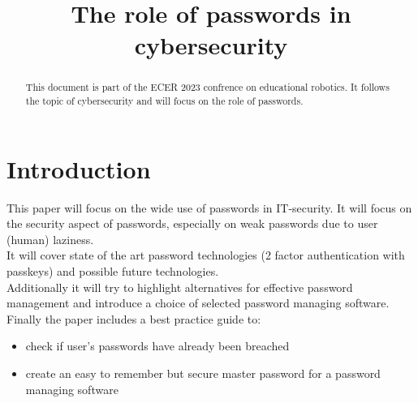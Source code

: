\documentclass[conference]{IEEEtran}
\begin{document}
\title{The role of passwords in cybersecurity}
\author{
\and
{}
\and
{}
\and
{}
}
\maketitle

\begin{abstract}
This document is part of the ECER 2023 confrence on educational robotics. It follows the topic of cybersecurity and will focus on the role of passwords.
\end{abstract}
\vspace{1cm}

\section{Introduction}
This paper will focus on the wide use of passwords in IT-security. It will focus on the security aspect of passwords, especially on weak passwords due to user (human) laziness. \\
It will cover state of the art password technologies (2 factor authentication with passkeys) and possible future technologies.\\
Additionally it will try to highlight alternatives for effective password management and introduce a choice of selected password managing software. \\
Finally the paper includes a best practice guide to:
\begin{itemize}
\item check if user's passwords have already been breached 
\item create an easy to remember but secure master password for a password managing software
\end{itemize} 
\end{document}
